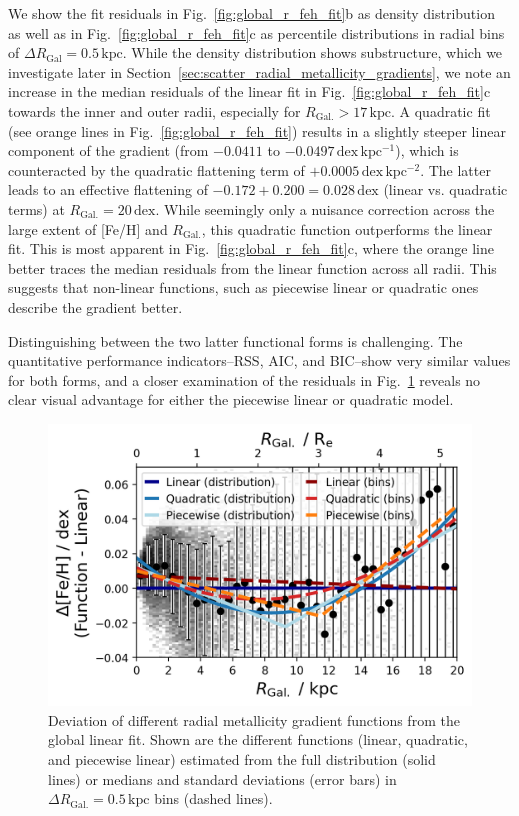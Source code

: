 \documentclass[twocolumn,apj,numberedappendix,appendixfloats,twocolappendix]{openjournal}
\begin{document}
\begin{CJK*}{UTF8}{gbsn}
We show the fit residuals in Fig.~\ref{fig:global_r_feh_fit}b as density distribution as well as in Fig.~\ref{fig:global_r_feh_fit}c as percentile distributions in radial bins of $\Delta R_\mathrm{Gal} = 0.5\,\mathrm{kpc}$. While the density distribution shows substructure, which we investigate later in Section~\ref{sec:scatter_radial_metallicity_gradients}, we note an increase in the median residuals of the linear fit in Fig.~\ref{fig:global_r_feh_fit}c towards the inner and outer radii, especially for $R_\mathrm{Gal.} > 17\,\mathrm{kpc}$. A quadratic fit (see orange lines in Fig.~\ref{fig:global_r_feh_fit}) results in a slightly steeper linear component of the gradient (from $-0.0411$ to $-0.0497\,\mathrm{dex\,kpc^{-1}}$), which is counteracted by the quadratic flattening term of $+0.0005\,\mathrm{dex\,kpc^{-2}}$. The latter leads to an effective flattening of $-0.172 + 0.200 = 0.028\,\mathrm{dex}$ (linear vs. quadratic terms) at $R_\mathrm{Gal.} = 20\,\mathrm{dex}$. While seemingly only a nuisance correction across the large extent of [Fe/H] and $R_\mathrm{Gal.}$, this quadratic function outperforms the linear fit. This is most apparent in Fig.~\ref{fig:global_r_feh_fit}c, where the orange line better traces the median residuals from the linear function across all radii. This suggests that non-linear functions, such as piecewise linear or quadratic ones describe the gradient better.

Distinguishing between the two latter functional forms is challenging. The quantitative performance indicators--RSS, AIC, and BIC--show very similar values for both forms, and a closer examination of the residuals in Fig.~\ref{fig:linear_quadratic_piecewise} reveals no clear visual advantage for either the piecewise linear or quadratic model.

\begin{figure}
    \centering
    \includegraphics[width=\columnwidth]{figures/linear_quadratic_piecewise.png}
    \caption{Deviation of different radial metallicity gradient functions from the global linear fit. Shown are the different functions (linear, quadratic, and piecewise linear) estimated from the full distribution (solid lines) or medians and standard deviations (error bars) in $\Delta R_\mathrm{Gal.} = 0.5\,\mathrm{kpc}$ bins (dashed lines).}
    \label{fig:linear_quadratic_piecewise}
\end{figure}


\end{CJK*}
\end{document}
